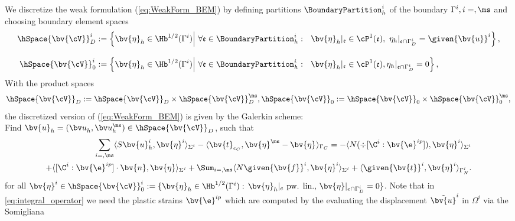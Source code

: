 We discretize the weak formulation (\ref{eq:WeakForm_BEM}) by defining  partitions $\BoundaryPartition^i_h$ of the boundary $\Gamma^i, i=\sl,\ms$ and choosing  boundary element spaces 
\begin{align*}
\hSpace{\bv{\cV}}^i_D &:= \left\lbrace \bv{\eta}_h \in \Hb^{1/2}(\Gamma^i) \middle|~\forall \mathfrak{e}\in \BoundaryPartition^i_h:~~ \bv{\eta}_h|_{\mathfrak{e}} \in \cP^1(\mathfrak{e}),~ \eta_h|_{\mathfrak{e} \cap \Gamma_D^i} =  \given{\bv{u}}^i \right\rbrace, \\[2ex]
\hSpace{\bv{\cV}}^i_0 &:= \left\lbrace \bv{\eta}_h \in \Hb^{1/2}(\Gamma^i) \middle|~\forall \mathfrak{e}\in \BoundaryPartition^i_h:~~ \bv{\eta}_h|_{\mathfrak{e}} \in \cP^1(\mathfrak{e}), \eta_h|_{\mathfrak{e} \cap \Gamma_D^i} =  0 \right\rbrace,
\end{align*}
With the product spaces
\begin{equation}\nonumber
\hSpace{\bv{\cV}}_D := \hSpace{\bv{\cV}}^{\sl}_D \times \hSpace{\bv{\cV}}^{\ms}_D, \\[2ex]
\hSpace{\bv{\cV}}_0 := \hSpace{\bv{\cV}}^{\sl}_0 \times \hSpace{\bv{\cV}}^{\ms}_0,
\end{equation}
the discretized version of (\ref{eq:WeakForm_BEM}) is given by the Galerkin scheme:\\
Find $\bv{u}_{h} = (\bv u^{\sl}_h,\bv u^{\ms}_h) \in \hSpace{\bv{\cV}}_D$, such that
\begin{equation}\label{eq:integral_operator}
\begin{split}
\sum_{i=\sl,\ms}\langle S\bv{u}_h^i,\bv{\eta} ^i\rangle_{\Sigma^i} 
-\langle
\bv{t}_{\epsilon_C},\bv{\eta}^{\ms}-\bv{\eta}^{\sl}\rangle_{\Gamma_C} = 
- \langle N(\div
[\C^i:\bv{\e}^{ip}]),\bv{\eta} ^i\rangle_{\Sigma^i}  \\+ \langle
[\C^i:\bv{\e}^{ip}]\cdot\bv{n},\bv{\eta} \rangle_{\Sigma^i} 
+\Sum_{i=\sl,\ms}\langle N\given{\bv{f}}^i,\bv{\eta}^i
\rangle_{\Sigma^i} +\langle \given{\bv{t}}^i,\bv{\eta}^i\rangle_{\Gamma_N^i}.
\end{split}
\end{equation}
for all  $\bv{\eta}^i\in\hSpace{\bv{\cV}} ^i_0:=\{\bv{\eta} _h\in\Hb^{1/2}(\Gamma^i):\,\bv{\eta} _{h}|_e\text{ 
  pw. lin.},\,\bv{\eta} |_{e\cap\Gamma_D^i}=0\}$. Note that in \ref{eq:integral_operator} we need the plastic strains $\bv{\e}^{ip}$ which are computed by the evaluating the displacement $\tilde{\bv{u}}^{i}$ in $\Omega^i$ via the Somigliana 
